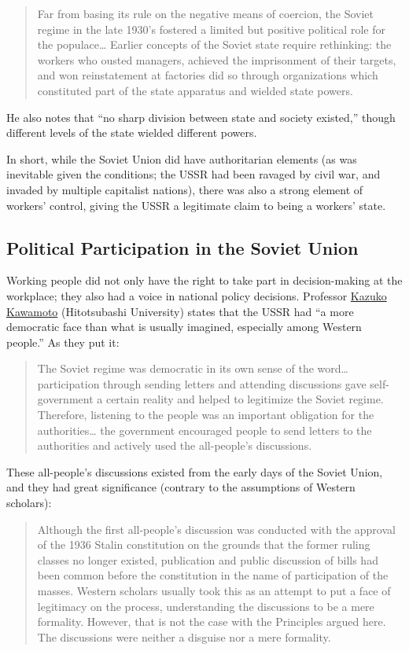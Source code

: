 \begin{quote}
Far from basing its rule on the negative means of coercion, the Soviet
regime in the late 1930's fostered a limited but positive political role
for the populace\ldots{} Earlier concepts of the Soviet state require
rethinking: the workers who ousted managers, achieved the imprisonment
of their targets, and won reinstatement at factories did so through
organizations which constituted part of the state apparatus and wielded
state powers.
\end{quote}

He also notes that ``no sharp division between state and society
existed,'' though different levels of the state wielded different
powers.

In short, while the Soviet Union did have authoritarian elements (as was
inevitable given the conditions; the USSR had been ravaged by civil war,
and invaded by multiple capitalist nations), there was also a strong
element of workers' control, giving the USSR a legitimate claim to being
a workers' state.

\subsection*{Political Participation in the Soviet Union}

Working people did not only have the right to take part in
decision-making at the workplace; they also had a voice in national
policy decisions. Professor
\href{https://researchmap.jp/read0148263/?lang=english}{Kazuko Kawamoto}
(Hitotsubashi University) states that the USSR had ``a more democratic
face than what is usually imagined, especially among Western people.''
As they put it:

\begin{quote}
The Soviet regime was democratic in its own sense of the word\ldots{}
participation through sending letters and attending discussions gave
self-government a certain reality and helped to legitimize the Soviet
regime. Therefore, listening to the people was an important obligation
for the authorities\ldots{} the government encouraged people to send
letters to the authorities and actively used the all-people's
discussions.
\end{quote}

These all-people's discussions existed from the early days of the Soviet
Union, and they had great significance (contrary to the assumptions of
Western scholars):

\begin{quote}
Although the first all-people's discussion was conducted with the
approval of the 1936 Stalin constitution on the grounds that the former
ruling classes no longer existed, publication and public discussion of
bills had been common before the constitution in the name of
participation of the masses. Western scholars usually took this as an
attempt to put a face of legitimacy on the process, understanding the
discussions to be a mere formality. However, that is not the case with
the Principles argued here. The discussions were neither a disguise nor
a mere formality.
\end{quote}

